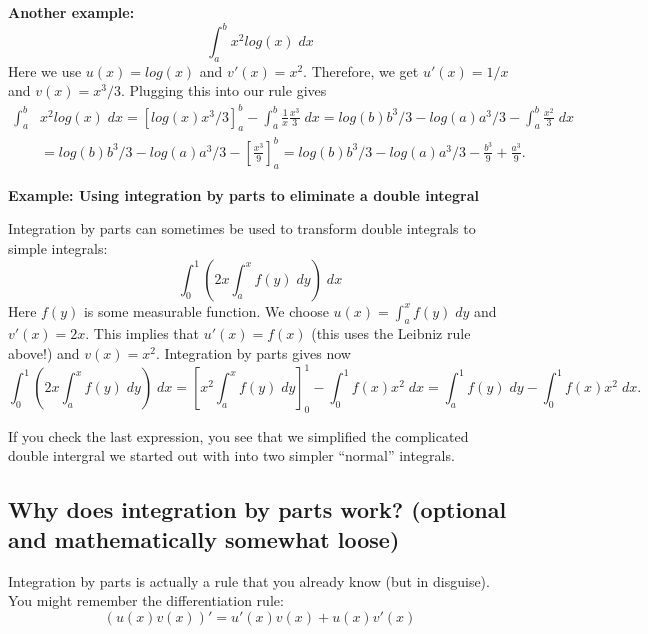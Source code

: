 \documentclass[a4paper,12pt]{article}
\begin{document}
\textbf{Another example: }
\begin{equation*}
  \int_a^b x^2 log(x)\;dx
\end{equation*}
Here we use $u(x)=log(x)$ and $v'(x)=x^2$. Therefore, we get $u'(x)=1/x$ and $v(x)=x^3/3$. Plugging this into our rule gives
\begin{align*}
  \int_a^b &x^2 log(x)\;dx=\left[log(x)x^3/3\right]_a^b- \int_a^b\frac{1}{x}\frac{x^3}{3}\;dx=log(b)b^3/3-log(a)a^3/3-\int_a^b\frac{x^2}{3}\;dx\\
&=log(b)b^3/3-log(a)a^3/3-\left[\frac{x^3}{9}\right]_a^b=log(b)b^3/3-log(a)a^3/3-\frac{b^3}{9}+\frac{a^3}{9}.
\end{align*}

\textbf{Example: Using integration by parts to eliminate a double integral}

Integration by parts can sometimes be used to transform double integrals to simple integrals:
\begin{equation*}
  \int_0^1\left(2x \int_a^x f(y)\;dy\right)\;dx
\end{equation*}
Here $f(y)$ is some measurable function. We choose $u(x)=\int_a^xf(y)\;dy$ and $v'(x)=2x$. This implies that $u'(x)=f(x)$ (this uses the Leibniz rule above!) and $v(x)=x^2$. Integration by parts gives now
\begin{equation*}
  \int_0^1\left(2x \int_a^x f(y)\;dy\right)\;dx= \left[x^2 \int_a^x f(y)\;dy\right]_0^1-\int_0^1f(x) x^2\;dx=\int_a^1f(y)\;dy-\int_0^1f(x)x^2\;dx.
\end{equation*}

If you check the last expression, you see that we simplified the complicated double intergral we started out with into two simpler ``normal'' integrals.


\subsection{Why does integration by parts work? (optional and mathematically somewhat loose)}
\label{sec:why-doe-sintegration}
Integration by parts is actually a rule that you already know (but in disguise). You might remember the differentiation rule:
\begin{equation*}
  \left(u(x) v(x)\right)'=u'(x)v(x)+u(x)v'(x)
\end{equation*}
\end{document}
